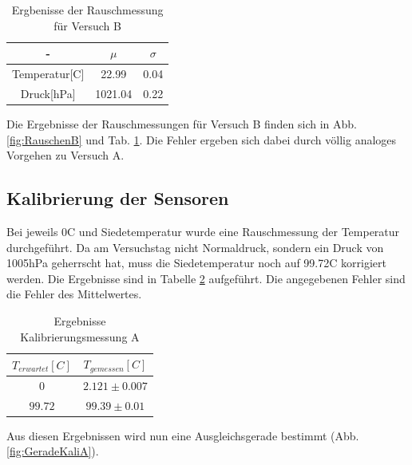 \documentclass[12pt,a4paper]{article}
\begin{document}
\begin{table}[H]
\begin{center}
\begin{tabular}{|c|c|c|}
\hline 
- & $\mu$ & $\sigma$\\ 
\hline 
Temperatur[C] & 22.99 & 0.04 \\ 
\hline 
Druck[hPa] & 1021.04 & 0.22\\ 
\hline 
\end{tabular}
\caption[Tabelle Rauschenmessung B]{Ergbenisse der Rauschmessung für Versuch B}
\label{tab:RauschenB}
\end{center}
\end{table}

Die Ergebnisse der Rauschmessungen für Versuch B finden sich in Abb. \ref{fig:RauschenB} und Tab. \ref{tab:RauschenB}. Die Fehler ergeben sich dabei durch völlig analoges Vorgehen zu Versuch A.



\subsection{Kalibrierung der Sensoren}

Bei jeweils 0C und Siedetemperatur wurde eine Rauschmessung der Temperatur durchgeführt. Da am Versuchstag nicht Normaldruck, sondern ein Druck von 1005hPa geherrscht hat, muss die Siedetemperatur noch auf 99.72C korrigiert werden. Die Ergebnisse sind in Tabelle \ref{tab:KaliA} aufgeführt. Die angegebenen Fehler sind die Fehler des Mittelwertes.

\begin{table}[H]
\begin{center}
\begin{tabular}{|c|c|}
\hline 
$T_{erwartet}[C]$ & $T_{gemessen}[C]$ \\ 
\hline 
$0$ & $2.121\pm0.007$ \\ %
\hline 
$99.72$ & $99.39\pm0.01$ \\ 
\hline 
\end{tabular}
\caption[Ergebnisse Kalibrierungsmessung A]{Ergebnisse Kalibrierungsmessung A} 
\label{tab:KaliA}
\end{center}
\end{table}

Aus diesen Ergebnissen wird nun eine Ausgleichsgerade bestimmt (Abb.\ref{fig:GeradeKaliA}).
\end{document}
